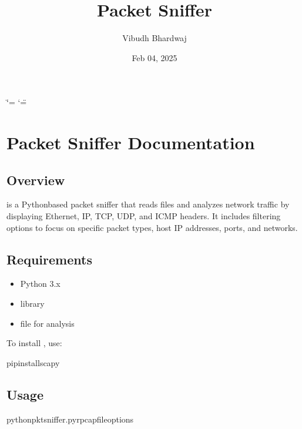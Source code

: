 \documentclass[letterpaper,10pt,english]{sphinxmanual}
\title{Packet Sniffer}
\date{Feb 04, 2025}
\author{Vibudh Bhardwaj}
\begin{document}
\ifdefined\shorthandoff
  \ifnum\catcode`\=\string=\active\shorthandoff{=}\fi
  \ifnum\catcode`\"=\active{}\fi
\fi

\pagestyle{empty}
\sphinxmaketitle
\pagestyle{plain}
\sphinxtableofcontents
\pagestyle{normal}
\label{\detokenize{index::doc}}


\sphinxstepscope


\chapter{Packet Sniffer Documentation}
\label{\detokenize{packet_sniffer_doc:packet-sniffer-documentation}}\label{\detokenize{packet_sniffer_doc::doc}}

\section{Overview}
\label{\detokenize{packet_sniffer_doc:overview}}
\sphinxAtStartPar
{} is a Python\sphinxhyphen{}based packet sniffer that reads  files and analyzes network traffic by displaying Ethernet, IP, TCP, UDP, and ICMP headers. It includes filtering options to focus on specific packet types, host IP addresses, ports, and networks.


\section{Requirements}
\label{\detokenize{packet_sniffer_doc:requirements}}\begin{itemize}
\item {} 
\sphinxAtStartPar
Python 3.x

\item {} 
\sphinxAtStartPar
{} library

\item {} 
\sphinxAtStartPar
{} file for analysis

\end{itemize}

\sphinxAtStartPar
To install , use:

\begin{sphinxVerbatim}[commandchars=\\\{\}]
pipinstallscapy
\end{sphinxVerbatim}


\section{Usage}
\label{\detokenize{packet_sniffer_doc:usage}}
\begin{sphinxVerbatim}[commandchars=\\\{\}]
pythonpktsniffer.py\PYGZhy{}r\PYGZlt{}pcap\PYGZus{}file\PYGZgt{}\PYG{o}{[}options\PYG{o}{]}
\end{sphinxVerbatim}
\end{document}
